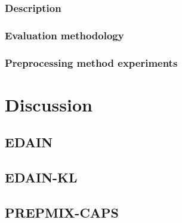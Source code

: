 \documentclass{statsmsc}
\begin{document}
{%
\subsection{Description}%
\label{sub:Description}


\subsection{Evaluation methodology}%
\label{sec:lob_meth}


\subsection{Preprocessing method experiments}%
\label{sub:Preprocessing method experiments}




\chapter{Discussion} %


\section{EDAIN}%
\label{sec:EDAIN-discuss}


\section{EDAIN-KL}%
\label{sec:EDAIN-KL-discuss}



\section{PREPMIX-CAPS}%
\label{sec:PREPMIX-CAPS}


}
\end{document}
